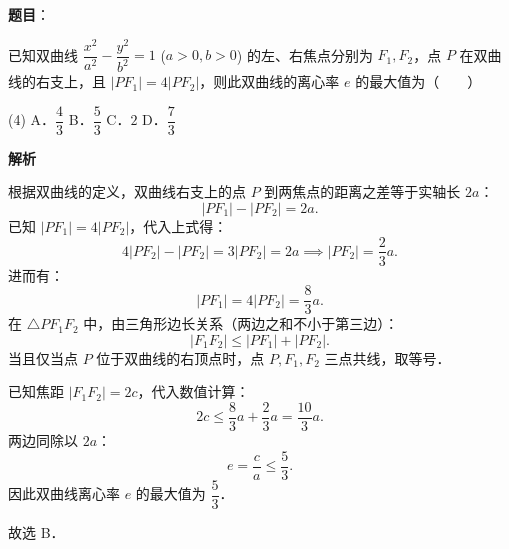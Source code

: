 \begin{answer}

\textbf{题目}：

已知双曲线 $\dfrac{x^2}{a^2} - \dfrac{y^2}{b^2} = 1$ ($a > 0, b > 0$) 的左、右焦点分别为 $F_1, F_2$，点 $P$ 在双曲线的右支上，且 $|PF_1| = 4|PF_2|$，则此双曲线的离心率 $e$ 的最大值为\mbox{（　　）}

\begin{gkopts}(4)
\task A．$\dfrac{4}{3}$
\task B．$\dfrac{5}{3}$
\task C．$2$
\task D．$\dfrac{7}{3}$
\end{gkopts}

\textbf{解析}

根据双曲线的定义，双曲线右支上的点 $P$ 到两焦点的距离之差等于实轴长 $2a$：
\nopagebreak[4]
\[
|PF_1| - |PF_2| = 2a.
\]
已知 $|PF_1| = 4|PF_2|$，代入上式得：
\nopagebreak[4]
\[
4|PF_2| - |PF_2| = 3|PF_2| = 2a \implies |PF_2| = \frac{2}{3}a.
\]
进而有：
\nopagebreak[4]
\[
|PF_1| = 4|PF_2| = \frac{8}{3}a.
\]
在 $\triangle PF_1F_2$ 中，由三角形边长关系（两边之和不小于第三边）：
\nopagebreak[4]
\[
|F_1F_2| \leqslant |PF_1| + |PF_2|.
\]
当且仅当点 $P$ 位于双曲线的右顶点时，点 $P, F_1, F_2$ 三点共线，取等号．

已知焦距 $|F_1F_2| = 2c$，代入数值计算：
\nopagebreak[4]
\[
2c \leqslant \frac{8}{3}a + \frac{2}{3}a = \frac{10}{3}a.
\]
两边同除以 $2a$：
\nopagebreak[4]
\[
e = \frac{c}{a} \leqslant \frac{5}{3}.
\]
因此双曲线离心率 $e$ 的最大值为 $\dfrac{5}{3}$．

故选 B．


\end{answer}
